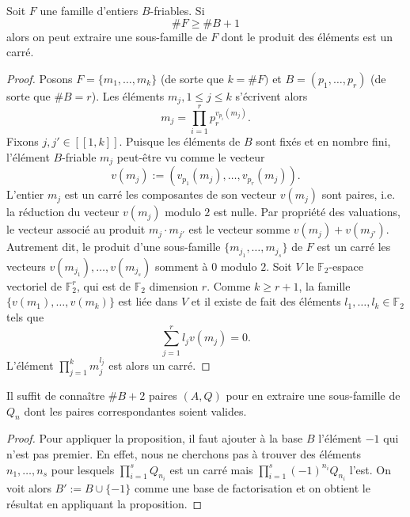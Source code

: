 \begin{proposition}
	Soit $F$ une famille d'entiers $B$-friables. Si \[\# F \geqslant \# B +
	1\] alors on peut extraire une sous-famille de $F$ dont le produit des
	éléments est un carré.
\end{proposition}

\begin{proof}
	Posons $F = \{m_1, \dots, m_k\}$ (de sorte que $k = \# F)$ et $B = (p_1,
	\dots, p_r)$ (de sorte que $\# B = r$). Les éléments $m_j, 1\leqslant j
	\leqslant k$ s'écrivent alors \[m_j = \prod_{i=1}^r p_r^{v_{p_i}(m_j)}.\]
	Fixons $j, j'\in [\![1, k]\!]$. Puisque les éléments de $B$ sont fixés et
	en nombre fini, l'élément $B$-friable $m_j$ peut-être vu comme le vecteur
	\[v(m_j) := (v_{p_1}(m_j), \dots, v_{p_r}(m_j)).\] L'entier $m_j$ est un
	carré \ssi les composantes de son vecteur $v(m_j)$ sont paires, i.e. la
	réduction du vecteur $v(m_j)$ modulo $2$ est nulle. Par propriété des
	valuations, le vecteur associé au produit $m_j\cdot m_{j'}$ est le vecteur
	somme $v(m_j) + v(m_{j'})$. Autrement dit, le produit d'une sous-famille
	$\{m_{j_1}, \dots, m_{j_s}\}$ de $F$ est un carré \ssi les vecteurs
	$v(m_{j_1}), \dots, v(m_{j_s})$ somment à $0$ modulo $2$. Soit $V$ le
	$\mathbb{F}_2$-espace vectoriel de $\mathbb{F}_2^r$, qui est de
	$\mathbb{F}_2$ dimension $r$. Comme $k\geqslant r+1$, la famille $\{v(m_1),
	\dots, v(m_k)\}$ est liée dans $V$ et il existe de fait des éléments $l_1,
	\dots, l_k\in \mathbb{F}_2$ tels que \[\sum_{j=1}^r l_j v(m_j) = 0.\]
	L'élément $\prod_{j=1}^k m_j^{l_j}$ est alors un carré.
\end{proof}

\begin{corollaire}
	Il suffit de connaître $\#B + 2$ paires $(A, Q)$ pour en extraire une
	sous-famille de $Q_n$ dont les paires correspondantes soient valides.
\end{corollaire}

\begin{proof}
	Pour appliquer la proposition, il faut ajouter à la base $B$ l'élément $-1$
	qui n'est pas premier. En effet, nous ne cherchons pas à trouver des
	éléments $n_1, \dots, n_s$ pour lesquels $\prod_{i=1}^s Q_{n_i}$ est un
	carré mais $\prod_{i=1}^s (-1)^{n_i}Q_{n_i}$ l'est. On voit alors $B' :=
	B\cup \{-1\}$ comme une base de factorisation et on obtient le résultat en
	appliquant la proposition.
\end{proof}

